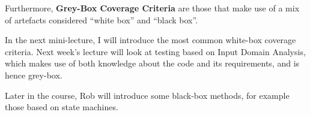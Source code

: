
Furthermore, {\bf Grey-Box Coverage Criteria} are those that make use of a mix of
artefacts considered ``white box'' and ``black box''. 

In the next mini-lecture, I will introduce the most common white-box
coverage criteria. Next week's lecture will look at testing based on Input
Domain Analysis, which makes use of both knowledge about the code and its
requirements, and is hence grey-box.

Later in the course, Rob will introduce some black-box methods, for example those
based on state machines.


